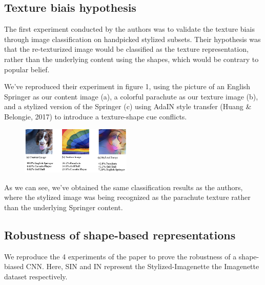 \documentclass{article}
\begin{document}
\subsection{Texture biais hypothesis}

The first experiment conducted by the authors was to validate the texture biais 
through image classification on handpicked stylized subsets. 
Their hypothesis was that the re-texturized image would be classified as the texture representation, rather than 
the underlying content using the shapes, which would be contrary to popular belief. \smallskip

\noindent
We've reproduced their experiment in figure 1, %
using the picture of an English Springer as our content image (a), 
a colorful parachute as our texture image (b),
and a stylized version of the Springer (c) using AdaIN style transfer 
(Huang \& Belongie, 2017) %
to introduce a texture-shape cue conflicts.

\begin{figure}[h!]\center
  \includegraphics[width=0.47\textwidth]{imgs/results-textures}
\end{figure}

\noindent
As we can see, we've obtained the same classification results as the authors, 
where the stylized image was being recognized as the parachute texture
rather than the underlying Springer content.

\subsection{Robustness of shape-based representations}

We reproduce the 4 experiments of the paper to prove the robustness of a shape-biased CNN.
Here, SIN and IN represent the Stylized-Imagenette the Imagenette dataset respectively.
\end{document}
